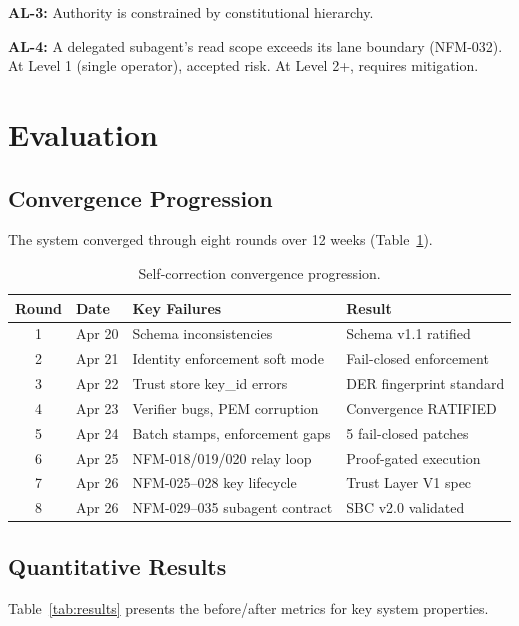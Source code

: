 \documentclass[11pt,letterpaper]{article}
\begin{document}
\textbf{AL-3:} Authority is constrained by constitutional hierarchy.

\textbf{AL-4:} A delegated subagent's read scope exceeds its lane boundary (NFM-032). At Level 1 (single operator), accepted risk. At Level 2+, requires mitigation.

\section{Evaluation}

\subsection{Convergence Progression}

The system converged through eight rounds over 12 weeks (Table~\ref{tab:convergence}).

\begin{table}[h]
\centering
\caption{Self-correction convergence progression.}
\label{tab:convergence}
\begin{tabular}{clll}
\toprule
\textbf{Round} & \textbf{Date} & \textbf{Key Failures} & \textbf{Result} \\
\midrule
1 & Apr 20 & Schema inconsistencies & Schema v1.1 ratified \\
2 & Apr 21 & Identity enforcement soft mode & Fail-closed enforcement \\
3 & Apr 22 & Trust store key\_id errors & DER fingerprint standard \\
4 & Apr 23 & Verifier bugs, PEM corruption & Convergence RATIFIED \\
5 & Apr 24 & Batch stamps, enforcement gaps & 5 fail-closed patches \\
6 & Apr 25 & NFM-018/019/020 relay loop & Proof-gated execution \\
7 & Apr 26 & NFM-025--028 key lifecycle & Trust Layer V1 spec \\
8 & Apr 26 & NFM-029--035 subagent contract & SBC v2.0 validated \\
\bottomrule
\end{tabular}
\end{table}

\subsection{Quantitative Results}

Table~\ref{tab:results} presents the before/after metrics for key system properties.
\end{document}
